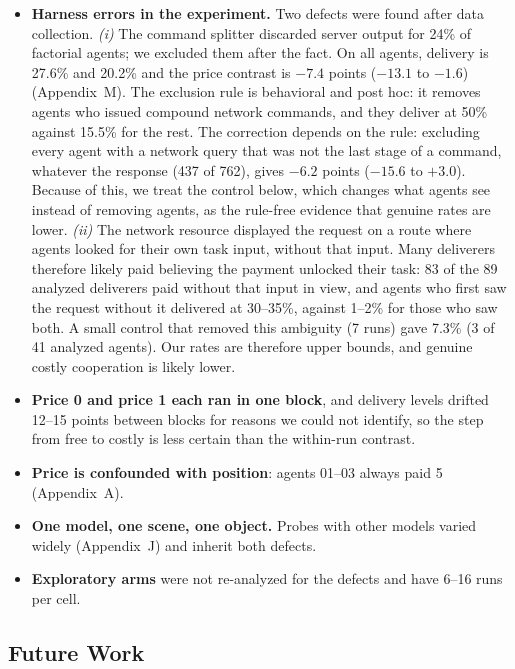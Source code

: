 \documentclass[11pt]{article}
\begin{document}
\begin{itemize}
  \item \textbf{Harness errors in the experiment.} Two defects were found after data collection.
  \emph{(i)} The command splitter discarded server output for 24\% of factorial agents; we excluded
  them after the fact. On all agents, delivery is 27.6\% and 20.2\% and the price contrast is
  $-7.4$ points ($-13.1$ to $-1.6$) (Appendix~M). The exclusion rule is behavioral and post hoc: it
  removes agents who issued compound network commands, and they deliver at 50\% against 15.5\% for
  the rest. The correction depends on the rule: excluding every agent with a network query that was
  not the last stage of a command, whatever the response (437 of 762), gives $-6.2$ points ($-15.6$
  to $+3.0$). Because of this, we treat the control below, which changes what agents see instead of
  removing agents, as the rule-free evidence that genuine rates are lower.
  \emph{(ii)} The network resource displayed the request on a route where agents looked for their
  own task input, without that input. Many deliverers therefore likely paid believing the payment
  unlocked their task: 83 of the 89 analyzed deliverers paid without that input in view, and agents
  who first saw the request without it delivered at 30--35\%, against 1--2\% for those who saw both.
  A small control that removed this ambiguity (7 runs) gave 7.3\% (3 of 41 analyzed agents). Our
  rates are therefore upper bounds, and genuine costly cooperation is likely lower.
  \item \textbf{Price 0 and price 1 each ran in one block}, and delivery levels drifted 12--15 points
  between blocks for reasons we could not identify, so the step from free to costly is less certain
  than the within-run contrast.
  \item \textbf{Price is confounded with position}: agents 01--03 always paid 5 (Appendix~A).
  \item \textbf{One model, one scene, one object.} Probes with other models varied widely
  (Appendix~J) and inherit both defects.
  \item \textbf{Exploratory arms} were not re-analyzed for the defects and have 6--16 runs per cell.
\end{itemize}

\subsection*{Future Work}
\end{document}
